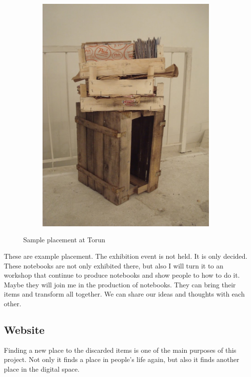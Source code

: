 \begin{figure}
\begin{subfigure}[b]{0.48\textwidth}
        \includegraphics[width=\textwidth]{project_graphics/torun2.jpg}
    \end{subfigure}
    \caption{Sample placement at Torun}
    \label{fig:ExperimentWithPaper}
\end{figure}

These are example placement. The exhibition event is not held. It is only decided. These notebooks are not only exhibited there, but also I will turn it to an workshop that continue to produce notebooks and show people to how to do it. Maybe they will join me in the production of notebooks. They can bring their items and transform all together. We can share our ideas and thoughts with each other. 





%
%
\subsection{Website}
Finding a new place to the discarded items is one of the main purposes of this project. Not only it finds a place in people's life again, but also it finds another place in the digital space.

